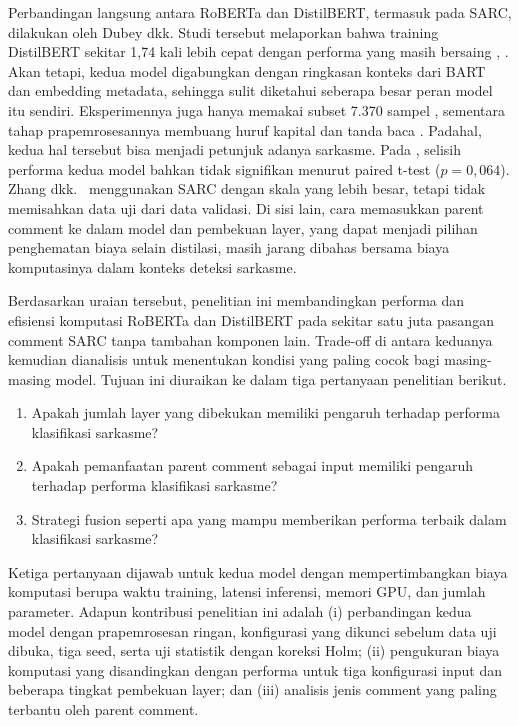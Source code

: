 \documentclass[conference]{IEEEtran}
\begin{document}
Perbandingan langsung antara RoBERTa dan DistilBERT, termasuk pada SARC, dilakukan oleh Dubey dkk. Studi tersebut melaporkan bahwa training DistilBERT sekitar 1,74 kali lebih cepat dengan performa yang masih bersaing \cite{dubey2025unpacking}, \cite{dubey2026efficient}. Akan tetapi, kedua model digabungkan dengan ringkasan konteks dari BART dan embedding metadata, sehingga sulit diketahui seberapa besar peran model itu sendiri. Eksperimennya juga hanya memakai subset 7.370 sampel \cite{dubey2025unpacking}, sementara tahap prapemrosesannya membuang huruf kapital dan tanda baca \cite{dubey2026efficient}. Padahal, kedua hal tersebut bisa menjadi petunjuk adanya sarkasme. Pada \cite{dubey2026efficient}, selisih performa kedua model bahkan tidak signifikan menurut paired t-test ($p = 0{,}064$). Zhang dkk.\ \cite{zhang2025enhancing} menggunakan SARC dengan skala yang lebih besar, tetapi tidak memisahkan data uji dari data validasi. Di sisi lain, cara memasukkan parent comment ke dalam model dan pembekuan layer, yang dapat menjadi pilihan penghematan biaya selain distilasi, masih jarang dibahas bersama biaya komputasinya dalam konteks deteksi sarkasme.

Berdasarkan uraian tersebut, penelitian ini membandingkan performa dan efisiensi komputasi RoBERTa dan DistilBERT pada sekitar satu juta pasangan comment SARC tanpa tambahan komponen lain. Trade-off di antara keduanya kemudian dianalisis untuk menentukan kondisi yang paling cocok bagi masing-masing model. Tujuan ini diuraikan ke dalam tiga pertanyaan penelitian berikut.
\begin{enumerate}
\item Apakah jumlah layer yang dibekukan memiliki pengaruh terhadap performa klasifikasi sarkasme?
\item Apakah pemanfaatan parent comment sebagai input memiliki pengaruh terhadap performa klasifikasi sarkasme?
\item Strategi fusion seperti apa yang mampu memberikan performa terbaik dalam klasifikasi sarkasme?
\end{enumerate}
Ketiga pertanyaan dijawab untuk kedua model dengan mempertimbangkan biaya komputasi berupa waktu training, latensi inferensi, memori GPU, dan jumlah parameter. Adapun kontribusi penelitian ini adalah (i) perbandingan kedua model dengan prapemrosesan ringan, konfigurasi yang dikunci sebelum data uji dibuka, tiga seed, serta uji statistik dengan koreksi Holm; (ii) pengukuran biaya komputasi yang disandingkan dengan performa untuk tiga konfigurasi input dan beberapa tingkat pembekuan layer; dan (iii) analisis jenis comment yang paling terbantu oleh parent comment.
\end{document}
